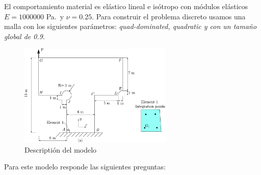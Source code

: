 \documentclass[a4paper,12pt]{article}
\begin{document}
El comportamiento material es elástico lineal e isótropo con módulos elásticos  $E=1000000$ Pa.~y $\nu=0.25$. Para construir el problema discreto usamos una malla con los siguientes parámetros: \textit{quad-dominated, quadratic y con un tamaño global de 0.9}.

\begin{figure}[!h]
  \begin{center}
    \includegraphics[width=0.65\textwidth]{./figs/imagen116}
  \end{center}
  \caption{Descriptión del modelo}
  \label{figu116}
\end{figure}

Para este modelo responde las siguientes preguntas:
\end{document}
